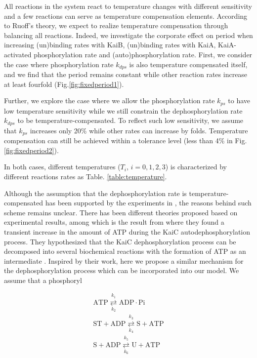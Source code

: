 \documentclass[a4paper,10pt]{article}
\numberwithin{equation}{section}
\begin{document}
All reactions in the system react to temperature changes with different sensitivity and a few reactions can serve as temperature compensation elements. According to Ruoff's theory, we expect to realize temperature compensation through balancing all reactions. Indeed, we investigate the corporate effect on period when increasing (un)binding rates with KaiB, (un)binding rates with KaiA, KaiA-activated phosphorylation rate and (auto)phosphorylation rate. 
First, we consider the case where phosphorylation rate $k_{dps}$ is also temperature compensated itself, and we find that the period remains constant while other reaction rates increase at least fourfold (Fig.\ref{fig:fixedperiod1}).



Further, we explore the case where we allow the phosphorylation rate $k_{ps}$ to have low temperature sensitivity while we still constrain the dephosphorylation rate $k_{dps}$ to be temperature-compensated. To reflect such low sensitivity, we assume that $k_{ps}$ increases only 20\% while other rates can increase by folds. Temperature compensation can still be achieved within a tolerance level (less than 4\% in Fig.\ref{fig:fixedperiod2}).

In both cases, different temperatures ($T_i$, $i=0,1,2,3$) is characterized by different reactions rates as Table. \ref{table:temperature}.


Although the assumption that the dephosphorylation rate is temperature-compensated has been supported by the experiments in \citet{Tamito2005}, the reasons behind such scheme remains unclear. There has been different theories proposed based on experimental results, among which is the result from \citet{kondo2012} where they found a transient increase in the amount of ATP during the KaiC autodephosphorylation process. They hypothesized that the KaiC dephosphorylation process can be decomposed into several biochemical reactions with the formation of ATP as an intermediate \citet{kondo2012}. Inspired by their work, here we propose a similar mechanism for the dephosphorylation process which can be incorporated into our model. We assume that a phosphoryl  


\begin{equation}
\begin{gathered}
\mathrm {ATP}\overset{ k_{1}}{\underset{k_{2}}{\rightleftarrows}} \mathrm { ADP\cdot Pi} \\
\mathrm {ST+ADP}\overset{ k_{3}}{\underset{k_{4}}{\rightleftarrows}} \mathrm {S + ATP} \\
\mathrm {S+ADP}\overset{ k_{5}}{\underset{k_{6}}{\rightleftarrows}} \mathrm{U + ATP} \\
\end{gathered}\label{eq:autodps}
\end{equation}
\end{document}
